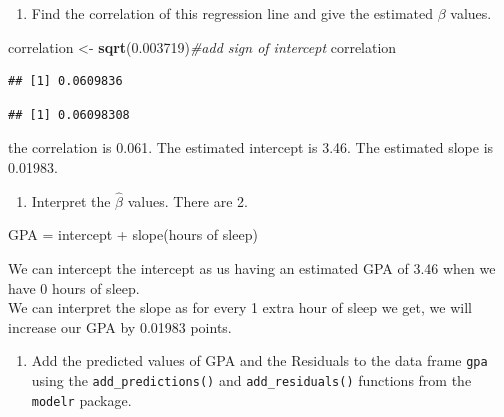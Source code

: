 \documentclass[]{article}
\newenvironment{Shaded}{\begin{snugshade}}{\end{snugshade}}
\newcommand{\CommentTok}[1]{\textcolor[rgb]{0.56,0.35,0.01}{\textit{#1}}}
\newcommand{\FloatTok}[1]{\textcolor[rgb]{0.00,0.00,0.81}{#1}}
\newcommand{\KeywordTok}[1]{\textcolor[rgb]{0.13,0.29,0.53}{\textbf{#1}}}
\newcommand{\NormalTok}[1]{#1}
\newcommand{\OperatorTok}[1]{\textcolor[rgb]{0.81,0.36,0.00}{\textbf{#1}}}
\newcommand{\StringTok}[1]{\textcolor[rgb]{0.31,0.60,0.02}{#1}}
\providecommand{\tightlist}{%
  \setlength{\itemsep}{0pt}\setlength{\parskip}{0pt}}
\begin{document}
\newpage

\begin{enumerate}
\def\labelenumi{\arabic{enumi}.}
\setcounter{enumi}{3}
\tightlist
\item
  Find the correlation of this regression line and give the estimated
  \(\beta\) values.
\end{enumerate}

\begin{Shaded}
\begin{Highlighting}[]
\NormalTok{correlation <-}\StringTok{ }\KeywordTok{sqrt}\NormalTok{(}\FloatTok{0.003719}\NormalTok{)}\CommentTok{#add sign of intercept}
\NormalTok{correlation}
\end{Highlighting}
\end{Shaded}

\begin{verbatim}
## [1] 0.0609836
\end{verbatim}

\begin{Shaded}
\end{Shaded}

\begin{verbatim}
## [1] 0.06098308
\end{verbatim}

the correlation is 0.061. The estimated intercept is 3.46. The estimated
slope is 0.01983.

\begin{enumerate}
\def\labelenumi{\arabic{enumi}.}
\setcounter{enumi}{4}
\tightlist
\item
  Interpret the \(\hat{\beta}\) values. There are 2.
\end{enumerate}

GPA = intercept + slope(hours of sleep)

We can intercept the intercept as us having an estimated GPA of 3.46
when we have 0 hours of sleep.\\
We can interpret the slope as for every 1 extra hour of sleep we get, we
will increase our GPA by 0.01983 points.

\newpage

\begin{enumerate}
\def\labelenumi{\arabic{enumi}.}
\setcounter{enumi}{5}
\tightlist
\item
  Add the predicted values of GPA and the Residuals to the data frame
  \texttt{gpa} using the \texttt{add\_predictions()} and
  \texttt{add\_residuals()} functions from the \texttt{modelr} package.
\end{enumerate}
\end{document}

